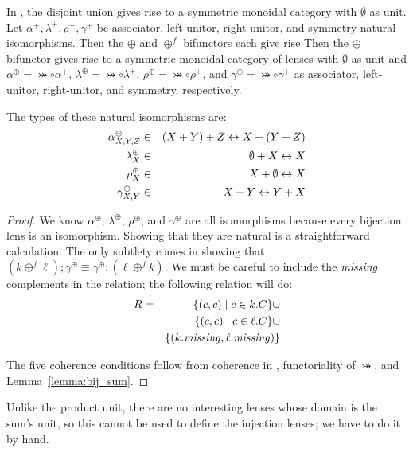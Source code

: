 \begin{defn}[$R$-similarity]
\begin{theorem}
\begin{lemma}
\begin{theorem}[No products]
\begin{lemma}
\begin{prop}
In \SET, the disjoint union gives rise to a symmetric monoidal category with
$\emptyset$ as unit. Let $\alpha^+,\lambda^+,\rho^+,\gamma^+$ be associator,
left-unitor, right-unitor, and symmetry natural isomorphisms.
%
\iffull
Then the $\oplus$ and $\oplus^f$ bifunctors each give rise
\else
Then the $\oplus$ bifunctor gives rise
\fi
%
to a symmetric monoidal category of lenses with $\emptyset$ as unit and
$\alpha^\oplus=\bij\circ\alpha^+$, $\lambda^\oplus=\bij\circ\lambda^+$,
$\rho^\oplus=\bij\circ\rho^+$, and $\gamma^\oplus=\bij\circ\gamma^+$ as
associator, left-unitor, right-unitor, and symmetry, respectively.

The types of these natural isomorphisms are:
\begin{eqnarray*}
    \alpha^\oplus_{X,Y,Z}  &\in& (X + Y) + Z \leftrightarrow X + (Y + Z) \\
    \lambda^\oplus_X       &\in& \emptyset + X \leftrightarrow X \\
    \rho^\oplus_X          &\in& X + \emptyset \leftrightarrow X \\
    \gamma^\oplus_{X,Y}    &\in& X + Y \leftrightarrow Y + X
\end{eqnarray*}

\end{prop}

\iffull
\begin{proof}
We know $\alpha^\oplus$, $\lambda^\oplus$, $\rho^\oplus$, and
$\gamma^\oplus$ are all isomorphisms because every bijection lens is an
isomorphism. Showing that they are natural is a straightforward calculation.
The only subtlety comes in showing that $(k\oplus^f\ell);\gamma^\oplus \equiv
\gamma^\oplus;(\ell\oplus^fk)$. We must be careful to include the $\mathit{missing}$
complements in the relation; the following relation will do:
\begin{eqnarray*}
    R &=& \{( c, c) \mid c \in k.C\}\cup \\
      & & \{( c, c) \mid c \in \ell.C\}\cup \\
      & & \{( k.\mathit{missing}, \ell.\mathit{missing})\}
\end{eqnarray*}

The five coherence conditions follow from coherence in \SET, functoriality of
$\bij$, and Lemma~\ref{lemma:bij_sum}.
\end{proof}
\fi

Unlike the product unit, there are no interesting lenses whose domain is the sum's
unit, so this cannot be used to define the injection lenses; we have to do
it by hand.


\end{lemma}
\end{theorem}
\end{lemma}
\end{theorem}
\end{defn}
